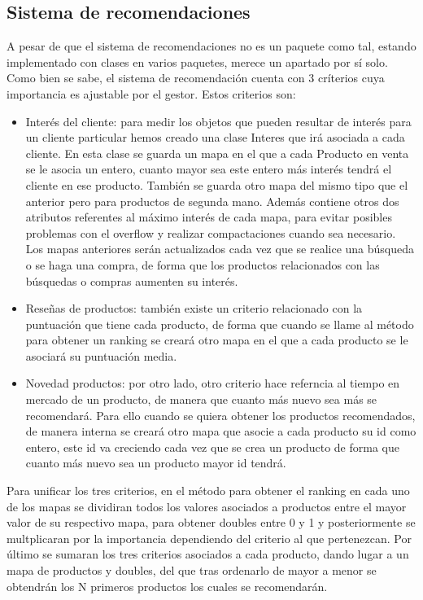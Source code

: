 \documentclass{article}
\begin{document}
\subsection{Sistema de recomendaciones}
A pesar de que el sistema de recomendaciones no es un paquete como tal, estando implementado con clases en varios paquetes, merece un apartado por sí solo. Como bien se sabe, el sistema de recomendación cuenta con 3 críterios cuya importancia es ajustable por el gestor. Estos criterios son:
\begin{itemize}
  \item Interés del cliente: para medir los objetos que pueden resultar de interés para un cliente particular hemos creado una clase Interes que irá asociada a cada cliente. En esta clase se guarda un mapa en el que a cada Producto en venta se le asocia un entero, cuanto mayor sea este entero más interés tendrá el cliente en ese producto. También se guarda otro mapa del mismo tipo que el anterior pero para productos de segunda mano. Además contiene otros dos atributos referentes al máximo interés de cada mapa, para evitar posibles problemas con el overflow y realizar compactaciones cuando sea necesario. \\
Los mapas anteriores serán actualizados cada vez que se realice una búsqueda o se haga una compra, de forma que los productos relacionados con las búsquedas o compras aumenten su interés.

\item Reseñas de productos: también existe un criterio relacionado con la puntuación que tiene cada producto, de forma que cuando se llame al método para obtener un ranking se creará otro mapa en el que a cada producto se le asociará su puntuación media.

\item Novedad productos: por otro lado, otro criterio hace referncia al tiempo en mercado de un producto, de manera que cuanto más nuevo sea más se recomendará. Para ello cuando se quiera obtener los productos recomendados, de manera interna se creará otro mapa que asocie a cada producto su id como entero, este id va creciendo cada vez que se crea un producto de forma que cuanto más nuevo sea un producto mayor id tendrá.
\end{itemize}

Para unificar los tres criterios, en el método para obtener el ranking en cada uno de los mapas se dividiran todos los valores asociados a productos entre el mayor valor de su respectivo mapa, para obtener doubles entre 0 y 1 y posteriormente se multplicaran por la importancia dependiendo del criterio al que pertenezcan. Por último se sumaran los tres criterios asociados a cada producto, dando lugar a un mapa de productos y doubles, del que tras ordenarlo de mayor a menor se obtendrán los N primeros productos los cuales se recomendarán.
\end{document}

